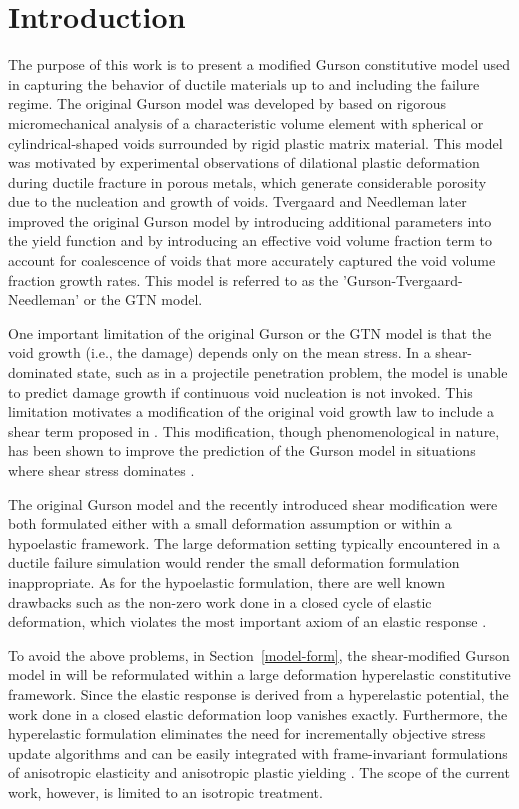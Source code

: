 
\chapter{Introduction}
\label{intro}

The purpose of this work is to present a modified Gurson constitutive
model used in capturing the behavior of ductile materials up to and
including the failure regime. The original Gurson model was developed
by \cite{Gurson1977} based on rigorous micromechanical analysis of a
characteristic volume element with spherical or cylindrical-shaped
voids surrounded by rigid plastic matrix material. This model was
motivated by experimental observations of dilational plastic
deformation during ductile fracture in porous metals, which generate
considerable porosity due to the nucleation and growth of
voids. Tvergaard and Needleman \cite{Tvergaard1984} later improved the
original Gurson model by introducing additional parameters into the
yield function and by introducing an effective void volume fraction
term to account for coalescence of voids that more accurately captured
the void volume fraction growth rates. This model is referred to as
the 'Gurson-Tvergaard-Needleman' or the GTN model.

One important limitation of the original Gurson or the GTN model is
that the void growth (i.e., the damage) depends only on the mean
stress. In a shear-dominated state, such as in a projectile
penetration problem, the model is unable to predict damage growth if
continuous void nucleation is not invoked. This limitation motivates a
modification of the original void growth law to include a shear term
proposed in \cite{Nahshon2008}. This modification, though
phenomenological in nature, has been shown to improve the prediction
of the Gurson model in situations where shear stress dominates
\cite{Nahshon2008,Nahshon2009}.

The original Gurson model and the recently introduced shear
modification were both formulated either with a small deformation
assumption or within a hypoelastic framework. The large deformation
setting typically encountered in a ductile failure simulation would
render the small deformation formulation inappropriate. As for the
hypoelastic formulation, there are well known drawbacks such as the
non-zero work done in a closed cycle of elastic deformation, which
violates the most important axiom of an elastic response
\cite{Belytschko2013}.

To avoid the above problems, in Section~\ref{model-form}, the
shear-modified Gurson model in \cite{Nahshon2008, Nahshon2009} will be
reformulated within a large deformation hyperelastic constitutive
framework. Since the elastic response is derived from a hyperelastic
potential, the work done in a closed elastic deformation loop vanishes
exactly. Furthermore, the hyperelastic formulation eliminates the need
for incrementally objective stress update algorithms and can be easily
integrated with frame-invariant formulations of anisotropic elasticity
and anisotropic plastic yielding \cite{Belytschko2013}. The scope of
the current work, however, is limited to an isotropic treatment.


